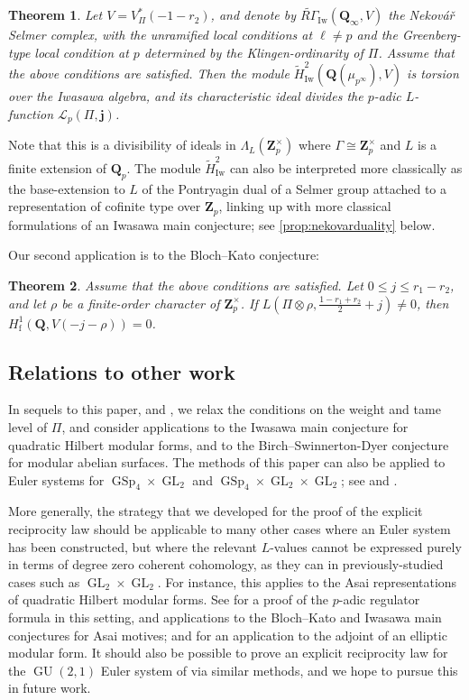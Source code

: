 \documentclass[cjm]{ipart}
\theoremstyle{plain}
\newtheorem{introtheorem}{Theorem}
\theoremstyle{remark}
\DeclareMathOperator{\GL}{GL}
\DeclareMathOperator{\GSp}{GSp}
\DeclareMathOperator{\Iw}{Iw}
\newcommand{\Nek}{Nekov\'a\v{r}\xspace}
\newcommand{\QQ}{\mathbf{Q}}
\newcommand{\Qp}{\QQ_p}
\newcommand{\RGt}{\widetilde{R\Gamma}}
\newcommand{\Zp}{\mathbf{Z}_p}
\newcommand{\bfj}{\mathbf{j}}
\newcommand{\cL}{\mathcal{L}}
\newcommand{\wH}{\widetilde{H}}
\numberwithin{equation}{subsection}
\renewcommand{\leq}{\leqslant}
\begin{document}
 \begin{introtheorem}
  Let $V=V_\Pi^*(-1-r_2)$, and denote by $\RGt_{\Iw}(\QQ_\infty,V)$ the \Nek \hspace{0.5ex} Selmer complex, with the unramified local conditions at $\ell\neq p$ and the Greenberg-type local condition at $p$ determined by the Klingen-ordinarity of $\Pi$. Assume that the above conditions are satisfied. Then the module $\wH^2_{\Iw}(\QQ(\mu_{p^\infty}), V)$ is torsion over the Iwasawa algebra, and its characteristic ideal divides the $p$-adic $L$-function $\cL_p(\Pi, \bfj)$.
 \end{introtheorem}

 Note that this is a divisibility of ideals in $\Lambda_L(\Zp^\times)$ where $\Gamma \cong \Zp^\times$ and $L$ is a finite extension of $\Qp$. The module $\wH^2_{\Iw}$ can also be interpreted more classically as the base-extension to $L$ of the Pontryagin dual of a Selmer group attached to a representation of cofinite type over $\Zp$, linking up with more classical formulations of an Iwasawa main conjecture; see \cref{prop:nekovarduality} below.

 Our second application is to the Bloch--Kato conjecture:

 \begin{introtheorem}
  Assume that the above conditions are satisfied. Let $0\leq j\leq r_1-r_2$, and let $\rho$ be a finite-order character of $\Zp^\times$. If $L\left(\Pi\otimes \rho,\frac{1-r_1+r_2}{2}+j\right)\neq 0$, then $H^1_\mathrm{f}(\QQ,V(-j-\rho))=0$.
 \end{introtheorem}


 \subsection*{Relations to other work}

  In sequels to this paper, \cite{LZ20-yoshida} and \cite{LZ21-BSD}, we relax the conditions on the weight and tame level of $\Pi$, and consider applications to the Iwasawa main conjecture for quadratic Hilbert modular forms, and to the Birch--Swinnerton-Dyer conjecture for modular abelian surfaces. The methods of this paper can also be applied to Euler systems for $\GSp_4 \times \GL_2$ and $\GSp_4 \times \GL_2 \times \GL_2$; see \cite{LZ20b-regulator} and \cite{LZ21-erl}.

  More generally, the strategy that we developed for the proof of the explicit reciprocity law should be applicable to many other cases where an Euler system has been constructed, but where the relevant $L$-values cannot be expressed purely in terms of degree zero coherent cohomology, as they can in previously-studied cases such as $\GL_2 \times \GL_2$. For instance, this applies to the Asai representations of quadratic Hilbert modular forms. See \cite{grossiloefflerzerbes-GO4} for a proof of the $p$-adic regulator formula in this setting, and applications to the Bloch--Kato and Iwasawa main conjectures for Asai motives; and \cite{LZ-adjoint} for an application to the adjoint of an elliptic modular form. It should also be possible to prove an explicit reciprocity law for the $\operatorname{GU}(2, 1)$ Euler system of \cite{LSZ-unitary} via similar methods, and we hope to pursue this in future work.
\end{document}
